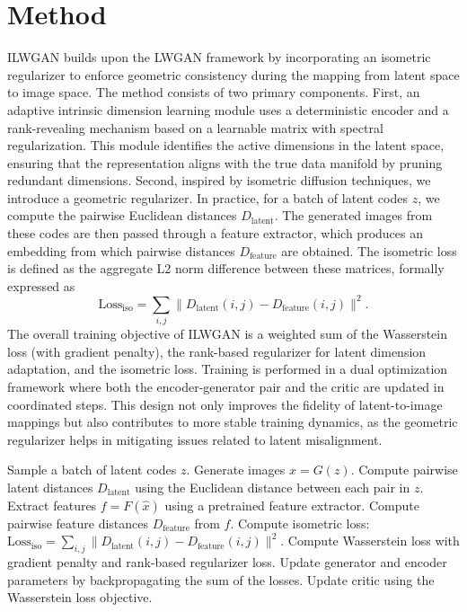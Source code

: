 \documentclass{article} %
\begin{document}
\section{Method}
\label{sec:method}
ILWGAN builds upon the LWGAN framework by incorporating an isometric regularizer to enforce geometric consistency during the mapping from latent space to image space. The method consists of two primary components. First, an adaptive intrinsic dimension learning module uses a deterministic encoder and a rank-revealing mechanism based on a learnable matrix with spectral regularization. This module identifies the active dimensions in the latent space, ensuring that the representation aligns with the true data manifold by pruning redundant dimensions. Second, inspired by isometric diffusion techniques, we introduce a geometric regularizer. In practice, for a batch of latent codes \(z\), we compute the pairwise Euclidean distances \(D_{\text{latent}}\). The generated images from these codes are then passed through a feature extractor, which produces an embedding from which pairwise distances \(D_{\text{feature}}\) are obtained. The isometric loss is defined as the aggregate L2 norm difference between these matrices, formally expressed as
\[
\text{Loss}_{\text{iso}} = \sum_{i,j} \|D_{\text{latent}}(i,j) - D_{\text{feature}}(i,j)\|^2.
\]
The overall training objective of ILWGAN is a weighted sum of the Wasserstein loss (with gradient penalty), the rank-based regularizer for latent dimension adaptation, and the isometric loss. Training is performed in a dual optimization framework where both the encoder-generator pair and the critic are updated in coordinated steps. This design not only improves the fidelity of latent-to-image mappings but also contributes to more stable training dynamics, as the geometric regularizer helps in mitigating issues related to latent misalignment.

\begin{algorithm}[H]
\caption{ILWGAN Training Step}
\begin{algorithmic}[1]
\State Sample a batch of latent codes \(z\).
\State Generate images \(\hat{x} = G(z)\).
\State Compute pairwise latent distances \(D_{\text{latent}}\) using the Euclidean distance between each pair in \(z\).
\State Extract features \(f = F(\hat{x})\) using a pretrained feature extractor.
\State Compute pairwise feature distances \(D_{\text{feature}}\) from \(f\).
\State Compute isometric loss: \(\text{Loss}_{\text{iso}} = \sum_{i,j} \|D_{\text{latent}}(i,j) - D_{\text{feature}}(i,j)\|^2\).
\State Compute Wasserstein loss with gradient penalty and rank-based regularizer loss.
\State Update generator and encoder parameters by backpropagating the sum of the losses.
\State Update critic using the Wasserstein loss objective.
\end{algorithmic}
\end{algorithm}
\end{document}
